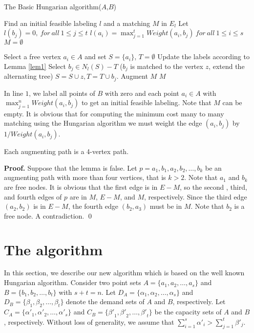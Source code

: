 \documentclass[preprint,12pt]{elsarticle}
\begin{document}
\begin{algorithm}
\caption{The Basic Hungarian algorithm($A$,$B$)}
\begin{algorithmic}[1]
\Initial \Comment Find an initial feasible labeling $l$ and a matching $M$ in $E_l$
\State Let $l(b_j)=0, \ for \ all \ 1 \le j \le t$
\State $l(a_i)=\max_{j=1}^t Weight(a_i,b_j)\  for\  all \ 1 \le i \le s$
\State $M= \emptyset$

 \State Select a free vertex $a_i  \in A$ and set $S = \{a_i\}$, $T=\emptyset$
  \Repeat
        \State Update the labels according to Lemma \ref{lem1}
        \EndWhile
         \State Select $b_j  \in N_l (S)-T$ 
          \Comment ($b_j$ is matched to the vertex $z$, extend the alternating tree)
            \State $S = S \cup {z},T = T \cup {b_j}$.
           \EndIf
    \State Augment $M$
\EndWhile
\Return $M$
\end{algorithmic}
 \end{algorithm}


In line $1$, we label all points of $B$ with zero and each point $a_i \in A$ with $\max_{j=1}^n Weight(a_i,b_j)$ to get an initial feasible labeling. Note that $M$ can be empty. It is obvious that for computing the minimum cost many to many matching using the Hungarian algorithm we must weight the edge $(a_i,b_j)$ by $1/Weight(a_i,b_j)$.   


\begin{lemma}
Each augmenting path is a 4-vertex path.
\end{lemma}
\textbf {Proof.} Suppose that the lemma is false. Let $p=a_1,b_1,a_2,b_2, \dots, b_k$ be an augmenting path with more than four vertices, that is $k>2$. Note that $a_1$ and $b_k$ are free nodes. It is obvious that the first edge is in $E-M$, so the second , third, and fourth edges of $p$ are in $M$, $E-M$, and $M$, respectively. Since the third edge $(a_2,b_2)$ is in $E-M$, the fourth edge $(b_2,a_3)$ must be in $M$. Note that $b_2$ is a free node. A contradiction. 
\qed

\section{The algorithm}
\label{newalgorithms}
In this section, we describe our new algorithm which is based on the well known Hungarian algorithm. Consider two point sets $A=\{a_1,a_2,\dots,a_s\}$ and $B=\{b_1,b_2,\dots,b_t\}$ with $s+t=n$. Let $D_A=\{\alpha_1,\alpha_2,\dots,\alpha_s\}$ and $D_B=\{\beta_1,\beta_2,\dots,\beta_t\}$ denote the demand sets of $A$ and $B$, respectively. Let $C_A=\{{\alpha '}_1,{\alpha '}_2,\dots,{\alpha '}_s\}$ and $C_B=\{{\beta '}_1,{\beta '}_2,\dots,{\beta '}_t\}$ be the capacity sets of $A$ and $B$, respectively. Without loss of generality, we assume that $\sum_{i=1}^s{\alpha}'_i>\sum_{j=1}^t{\beta}'_j$. 
\end{document}
